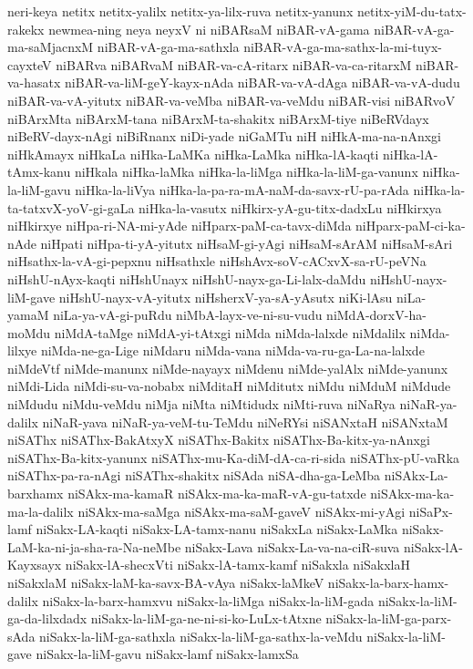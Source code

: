 {neri-keya
netitx
netitx-yalilx
netitx-ya-lilx-ruva
netitx-yanunx
netitx-yiM-du-tatx-rakekx
newmea-ning
neya
neyxV
ni
niBARsaM
niBAR-vA-gama
niBAR-vA-ga-ma-saMjacnxM
niBAR-vA-ga-ma-sathxla
niBAR-vA-ga-ma-sathx-la-mi-tuyx-cayxteV
niBARva
niBARvaM
niBAR-va-cA-ritarx
niBAR-va-ca-ritarxM
niBAR-va-hasatx
niBAR-va-liM-geY-kayx-nAda
niBAR-va-vA-dAga
niBAR-va-vA-dudu
niBAR-va-vA-yitutx
niBAR-va-veMba
niBAR-va-veMdu
niBAR-visi
niBARvoV
niBArxMta
niBArxM-tana
niBArxM-ta-shakitx
niBArxM-tiye
niBeRVdayx
niBeRV-dayx-nAgi
niBiRnanx
niDi-yade
niGaMTu
niH
niHkA-ma-na-nAnxgi
niHkAmayx
niHkaLa
niHka-LaMKa
niHka-LaMka
niHka-lA-kaqti
niHka-lA-tAmx-kanu
niHkala
niHka-laMka
niHka-la-liMga
niHka-la-liM-ga-vanunx
niHka-la-liM-gavu
niHka-la-liVya
niHka-la-pa-ra-mA-naM-da-savx-rU-pa-rAda
niHka-la-ta-tatxvX-yoV-gi-gaLa
niHka-la-vasutx
niHkirx-yA-gu-titx-dadxLu
niHkirxya
niHkirxye
niHpa-ri-NA-mi-yAde
niHparx-paM-ca-tavx-diMda
niHparx-paM-ci-ka-nAde
niHpati
niHpa-ti-yA-yitutx
niHsaM-gi-yAgi
niHsaM-sArAM
niHsaM-sAri
niHsathx-la-vA-gi-pepxnu
niHsathxle
niHshAvx-soV-cACxvX-sa-rU-peVNa
niHshU-nAyx-kaqti
niHshUnayx
niHshU-nayx-ga-Li-lalx-daMdu
niHshU-nayx-liM-gave
niHshU-nayx-vA-yitutx
niHsherxV-ya-sA-yAsutx
niKi-lAsu
niLa-yamaM
niLa-ya-vA-gi-puRdu
niMbA-layx-ve-ni-su-vudu
niMdA-dorxV-ha-moMdu
niMdA-taMge
niMdA-yi-tAtxgi
niMda
niMda-lalxde
niMdalilx
niMda-lilxye
niMda-ne-ga-Lige
niMdaru
niMda-vana
niMda-va-ru-ga-La-na-lalxde
niMdeVtf
niMde-manunx
niMde-nayayx
niMdenu
niMde-yalAlx
niMde-yanunx
niMdi-Lida
niMdi-su-va-nobabx
niMditaH
niMditutx
niMdu
niMduM
niMdude
niMdudu
niMdu-veMdu
niMja
niMta
niMtidudx
niMti-ruva
niNaRya
niNaR-ya-dalilx
niNaR-yava
niNaR-ya-veM-tu-TeMdu
niNeRYsi
niSANxtaH
niSANxtaM
niSAThx
niSAThx-BakAtxyX
niSAThx-Bakitx
niSAThx-Ba-kitx-ya-nAnxgi
niSAThx-Ba-kitx-yanunx
niSAThx-mu-Ka-diM-dA-ca-ri-sida
niSAThx-pU-vaRka
niSAThx-pa-ra-nAgi
niSAThx-shakitx
niSAda
niSA-dha-ga-LeMba
niSAkx-La-barxhamx
niSAkx-ma-kamaR
niSAkx-ma-ka-maR-vA-gu-tatxde
niSAkx-ma-ka-ma-la-dalilx
niSAkx-ma-saMga
niSAkx-ma-saM-gaveV
niSAkx-mi-yAgi
niSaPx-lamf
niSakx-LA-kaqti
niSakx-LA-tamx-nanu
niSakxLa
niSakx-LaMka
niSakx-LaM-ka-ni-ja-sha-ra-Na-neMbe
niSakx-Lava
niSakx-La-va-na-ciR-suva
niSakx-lA-Kayxsayx
niSakx-lA-shecxVti
niSakx-lA-tamx-kamf
niSakxla
niSakxlaH
niSakxlaM
niSakx-laM-ka-savx-BA-vAya
niSakx-laMkeV
niSakx-la-barx-hamx-dalilx
niSakx-la-barx-hamxvu
niSakx-la-liMga
niSakx-la-liM-gada
niSakx-la-liM-ga-da-lilxdadx
niSakx-la-liM-ga-ne-ni-si-ko-LuLx-tAtxne
niSakx-la-liM-ga-parx-sAda
niSakx-la-liM-ga-sathxla
niSakx-la-liM-ga-sathx-la-veMdu
niSakx-la-liM-gave
niSakx-la-liM-gavu
niSakx-lamf
niSakx-lamxSa
}
